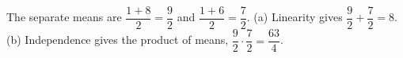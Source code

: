 The separate means are $\dfrac{1+8}{2}=\dfrac{9}{2}$ and $\dfrac{1+6}{2}=\dfrac{7}{2}$. (a) Linearity gives $\dfrac{9}{2}+\dfrac{7}{2}=\boxed8$. (b) Independence gives the product of means, $\dfrac{9}{2}\cdot\dfrac{7}{2}=\boxed{\dfrac{63}{4}}$.
